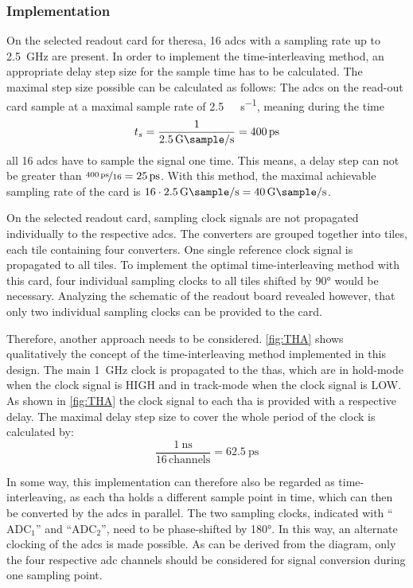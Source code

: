 \subsubsection{Implementation}\label{ssec:interl_impl}
On the selected readout card for \gls{theresa}, 16 \glspl{adc} with a sampling rate up to \SI{2.5}{\GHz} are present.
In order to implement the time-interleaving method, an appropriate delay step size for the sample time has to be calculated.
The maximal step size possible can be calculated as follows: 
The \glspl{adc} on the read-out card sample at a maximal sample rate of \SI{2.5}{\giga\sample\per\second}, meaning during the time
\begin{equation}
	t_s = \frac{1}{\SI{2.5}{\giga \sample \per \second}} = \SI{400}{\pico \second}
\end{equation}
all 16 \glspl{adc} have to sample the signal one time.
This means, a delay step can not be greater than $\nicefrac{\SI{400}{\pico\second}}{16} = \SI{25}{\pico\second}$.
With this method, the maximal achievable sampling rate of the card is $16 \cdot \SI{2.5}{\giga\sample\per\second}  = \SI{40}{\giga\sample\per\second}$. 

On the selected readout card, sampling clock signals are not propagated individually to the respective \glspl{adc}.
The converters are grouped together into tiles, each tile containing four converters.
One single reference clock signal is propagated to all tiles. 
To implement the optimal time-interleaving method with this card, four individual sampling clocks to all tiles shifted by \ang{90} would be necessary.
Analyzing the schematic of the readout board revealed however, that only two individual sampling clocks can be provided to the card.

Therefore, another approach needs to be considered.
\autoref{fig:THA} shows qualitatively the concept of the time-interleaving method implemented in this design.
The main \SI{1}{\GHz} clock is propagated to the \glspl{tha}, which are in hold-mode when the clock signal is HIGH and in track-mode when the clock signal is LOW.
As shown in \autoref{fig:THA} the clock signal to each \gls{tha} is provided with a respective delay.
The maximal delay step size to cover the whole period of the clock is calculated by: 
\begin{equation}
	\frac{\SI{1}{\nano\second}}{16 \, \text{channels}} = \SI{62.5}{\pico\second}
\end{equation}

In some way, this implementation can therefore also be regarded as time-interleaving, as each \gls{tha} holds a different sample point in time, which can then be converted by the \glspl{adc} in parallel.
The two sampling clocks, indicated with ``$\text{ADC}_1$'' and ``$\text{ADC}_2$'', need to be phase-shifted by \ang{180}.
In this way, an alternate clocking of the \glspl{adc} is made possible.
As can be derived from the diagram, only the four respective \gls{adc} channels should be considered for signal conversion during one sampling point.

